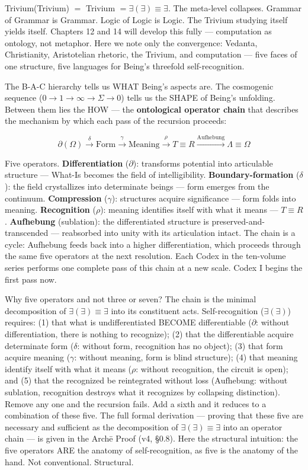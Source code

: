 \documentclass[10pt, openany, oneside]{book}
\begin{document}
Trivium(Trivium) $=$ Trivium $= \exists(\exists) \equiv \exists$. The meta-level collapses. Grammar of Grammar is Grammar. Logic of Logic is Logic. The Trivium studying itself yields itself. Chapters 12 and 14 will develop this fully --- computation as ontology, not metaphor. Here we note only the convergence: Vedanta, Christianity, Aristotelian rhetoric, the Trivium, and computation --- five faces of one structure, five languages for Being's threefold self-recognition.

The B-A-C hierarchy tells us WHAT Being's aspects are. The cosmogenic sequence ($0 \to 1 \to \infty \to \Sigma \to 0$) tells us the SHAPE of Being's unfolding. Between them lies the HOW --- the \textbf{ontological operator chain} that describes the mechanism by which each pass of the recursion proceeds:

$$\partial(\Omega) \xrightarrow{\delta} \text{Form} \xrightarrow{\gamma} \text{Meaning} \xrightarrow{\rho} T \equiv R \xrightarrow{\text{Aufhebung}} \Lambda \equiv \Omega$$

Five operators. \textbf{Differentiation} ($\partial$): transforms potential into articulable structure --- What-Is becomes the field of intelligibility. \textbf{Boundary-formation} ($\delta$): the field crystallizes into determinate beings --- form emerges from the continuum. \textbf{Compression} ($\gamma$): structures acquire significance --- form folds into meaning. \textbf{Recognition} ($\rho$): meaning identifies itself with what it means --- $T \equiv R$. \textbf{Aufhebung} (sublation): the differentiated structure is preserved-and-transcended --- reabsorbed into unity with its articulation intact. The chain is a cycle: Aufhebung feeds back into a higher differentiation, which proceeds through the same five operators at the next resolution. Each Codex in the ten-volume series performs one complete pass of this chain at a new scale. Codex I begins the first pass now.

Why five operators and not three or seven? The chain is the minimal decomposition of $\exists(\exists) \equiv \exists$ into its constituent acts. Self-recognition ($\exists(\exists)$) requires: (1) that what is undifferentiated BECOME differentiable ($\partial$: without differentiation, there is nothing to recognize); (2) that the differentiable acquire determinate form ($\delta$: without form, recognition has no object); (3) that form acquire meaning ($\gamma$: without meaning, form is blind structure); (4) that meaning identify itself with what it means ($\rho$: without recognition, the circuit is open); and (5) that the recognized be reintegrated without loss ($\text{Aufhebung}$: without sublation, recognition destroys what it recognizes by collapsing distinction). Remove any one and the recursion fails. Add a sixth and it reduces to a combination of these five. The full formal derivation --- proving that these five are necessary and sufficient as the decomposition of $\exists(\exists) \equiv \exists$ into an operator chain --- is given in the Arch\={e} Proof (v4, \S 0.8). Here the structural intuition: the five operators ARE the anatomy of self-recognition, as five is the anatomy of the hand. Not conventional. Structural.
\end{document}
